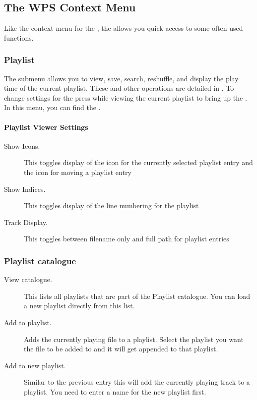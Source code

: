 \subsection{\label{sec:contextmenu}The WPS Context Menu}
Like the context menu for the , the 
allows you quick access to some often used functions.

\subsubsection{Playlist}
The  submenu allows you to view, save, search, reshuffle,
and display the play time of the current playlist. These and other operations
are detailed in . To change settings for
the  press \ActionStdContext{} while viewing the
current playlist to bring up the . In this
menu, you can find the .

\paragraph{Playlist Viewer Settings}
  \begin{description}
    \item[Show Icons.] This toggles display of the icon for the currently
    selected playlist entry and the icon for moving a playlist entry
    \item[Show Indices.] This toggles display of the line numbering for
       the playlist
    \item[Track Display.] This toggles between filename only and full path
       for playlist entries
  \end{description}

    
\subsubsection{Playlist catalogue}
  \begin{description}
    \item [View catalogue.] This lists all playlists that are part of the
    Playlist catalogue. You can load a new playlist directly from this list.
    \item [Add to playlist.] Adds the currently playing file to a playlist.
    Select the playlist you want the file to be added to and it will get
    appended to that playlist.
    \item [Add to new playlist.] Similar to the previous entry this will
    add the currently playing track to a playlist. You need to enter a name
    for the new playlist first.
  \end{description}

